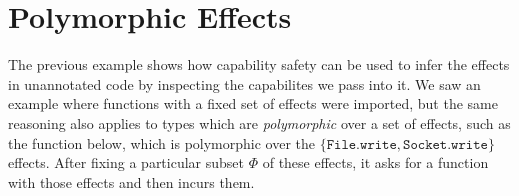 \documentclass[sigplan,10pt]{acmart}\settopmatter{}
\newcommand{\kwa}[1]{\mathtt{#1}}
\newcommand{\epscalc}{\kwa{CC}}
\begin{document}
%
%
%

\section{Polymorphic Effects}

The previous example shows how capability safety can be used to infer the effects in unannotated code by inspecting the capabilites we pass into it. We saw an example where functions with a fixed set of effects were imported, but the same reasoning also applies to types which are \textit{polymorphic} over a set of effects, such as the function below, which is polymorphic over the $\{ \kwa{File.write, Socket.write} \}$ effects. After fixing a particular subset $\Phi$ of these effects, it asks for a function with those effects and then incurs them.
\end{document}
